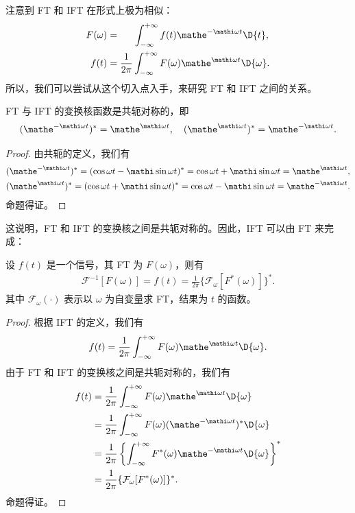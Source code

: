 注意到 FT 和 IFT 在形式上极为相似：
\begin{align*}
    F(\omega) & = \quad\;\; \int_{-\infty}^{+\infty} f(t)\mathe^{-\mathi\omega t}\D{t}, \\
    f(t) & = \frac{1}{2\pi} \int_{-\infty}^{+\infty} F(\omega)\mathe^{\mathi\omega t}\D{\omega}.
\end{align*}
所以，我们可以尝试从这个切入点入手，来研究 FT 和 IFT 之间的关系。

\begin{lemma}
    FT 与 IFT 的变换核函数是共轭对称的，即
    \begin{align*}
        (\mathe^{-\mathi\omega t})^* = \mathe^{\mathi\omega t}, \quad
        (\mathe^{\mathi\omega t})^* = \mathe^{-\mathi\omega t}.
    \end{align*}
\end{lemma}

\begin{proof}
    由共轭的定义，我们有
    \begin{align*}
        (\mathe^{-\mathi\omega t})^* = (\cos\omega t - \mathi\sin\omega t)^* = \cos\omega t + \mathi\sin\omega t = \mathe^{\mathi\omega t}, \\
        (\mathe^{\mathi\omega t})^* = (\cos\omega t + \mathi\sin\omega t)^* = \cos\omega t - \mathi\sin\omega t = \mathe^{-\mathi\omega t}.
    \end{align*}
    命题得证。
\end{proof}

这说明，FT 和 IFT 的变换核之间是共轭对称的。因此，IFT 可以由 FT 来完成：

\begin{theorem}
    设 $f(t)$ 是一个信号，其 FT 为 $F(\omega)$，则有
    \begin{align*}
        \mathcal{F}^{-1}[F(\omega)] = f(t) = \frac{1}{2\pi}\{\mathcal{F}_{\omega}[F^*(\omega)]\}^*.
    \end{align*}
    其中 $\mathcal{F}_\omega(\cdot)$ 表示以 $\omega$ 为自变量求 FT，结果为 $t$ 的函数。
\end{theorem}

\begin{proof}
    根据 IFT 的定义，我们有
    \begin{align*}
        f(t) = \frac{1}{2\pi} \int_{-\infty}^{+\infty} F(\omega)\mathe^{\mathi\omega t}\D{\omega}.
    \end{align*}
    由于 FT 和 IFT 的变换核之间是共轭对称的，我们有
    \begin{align*}
        f(t) & = \frac{1}{2\pi} \int_{-\infty}^{+\infty} F(\omega)\mathe^{\mathi\omega t}\D{\omega} \\
        & = \frac{1}{2\pi} \int_{-\infty}^{+\infty} F(\omega)(\mathe^{-\mathi\omega t})^*\D{\omega} \\
        & = \frac{1}{2\pi} \left\{\int_{-\infty}^{+\infty} F^*(\omega)\mathe^{-\mathi\omega t}\D{\omega}\right\}^* \\
        & = \frac{1}{2\pi}\{\mathcal{F}_{\omega}[F^*(\omega)]\}^*.
    \end{align*}
    命题得证。
\end{proof}

